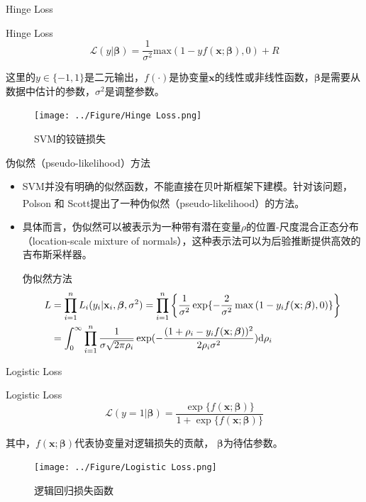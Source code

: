 \documentclass{beamer}
\newcommand{\supcite}[1]{\textsuperscript{\cite{#1}}}
\begin{document}
	\begin{frame}{Hinge Loss}
		\begin{exampleblock}{Hinge Loss}
			\begin{equation}
				\mathcal{L}(y|\bm{\beta}) = \frac{1}{\sigma^2} \text{max}(1 - y f(\mathbf{x}; \bm{\beta}), 0) + R
			\end{equation}
		\end{exampleblock}
		这里的$y\in\{-1,1\}$是二元输出，$f(\cdot)$是协变量$\mathbf{x}$的线性或非线性函数，$\bm{\beta}$是需要从数据中估计的参数，$\sigma^{2}$是调整参数。
		\begin{figure}
			\texttt{[image: ../Figure/Hinge Loss.png]}
			\caption{SVM的铰链损失}
		\end{figure}
	\end{frame}
	\begin{frame}{伪似然（pseudo-likelihood）方法}
		\begin{itemize}[<+->]
			\item SVM并没有明确的似然函数，不能直接在贝叶斯框架下建模。针对该问题，Polson 和 Scott提出了一种伪似然（pseudo-likelihood）的方法\supcite{c}。
			\item 具体而言，伪似然可以被表示为一种带有潜在变量$\rho$的位置-尺度混合正态分布（location-scale mixture of normals），这种表示法可以为后验推断提供高效的吉布斯采样器。
			\begin{exampleblock}{伪似然方法}
				\begin{align}
					L &= \prod_{i=1}^{n} L_{i}(y_{i}|\mathbf{x}_{i}, \bm{\beta}, \sigma^{2}) \notag 
					= \prod_{i=1}^{n} \left\{ \dfrac{1}{\sigma^{2}} \exp\{-\dfrac{2}{\sigma^{2}} \max\left(1 - y_{i} f(\mathbf{x}; \bm{\beta}), 0 \right)\} \right\}\notag \\
					&= \int_{0}^{\infty}\prod_{i=1}^{n}\dfrac{1}{\sigma\sqrt{2\pi\rho_{i}}}\exp(-\dfrac{(1+\rho_{i} - y_{i}f(\mathbf{x};\bm{\beta}))^{2}}{2\rho_{i}\sigma^{2}})\text{d}\rho_{i}
					\label{Equation:pseudo-likelihood}
				\end{align}
			\end{exampleblock}
		\end{itemize}
	\end{frame}
	\begin{frame}{Logistic Loss}
		\begin{exampleblock}{Logistic Loss}
			\begin{equation}
				\mathcal{L}(y=1|\bm{\beta}) = \frac{\exp\{f(\mathbf{x}; \bm{\beta})\}}{1 + \exp\{f(\mathbf{x}; \bm{\beta})\}}
			\end{equation}
		\end{exampleblock}
		其中，$f(\mathbf{x};\bm{\beta})$代表协变量对逻辑损失的贡献， $\bm{\beta}$为待估参数。
		\begin{figure}
			\texttt{[image: ../Figure/Logistic Loss.png]}
			\caption{逻辑回归损失函数}
		\end{figure}
	\end{frame}
\end{document}
